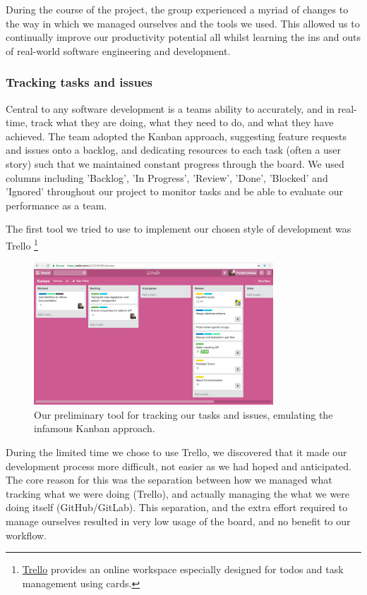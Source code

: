 During the course of the project, the group experienced a myriad of changes to the way in which we managed ourselves and the tools we used. This allowed us to continually improve our productivity potential all whilst learning the ins and outs of real-world software engineering and development.

\subsubsection{Tracking tasks and issues}

Central to any software development is a teams ability to accurately, and in real-time, track what they are doing, what they need to do, and what they have achieved. The team adopted the Kanban approach, suggesting feature requests and issues onto a backlog, and dedicating resources to each task (often a user story) such that we maintained constant progress through the board. We used columns including 'Backlog', 'In Progress', 'Review', 'Done',  'Blocked' and 'Ignored' throughout our project to monitor tasks and be able to evaluate our performance as a team.

The first tool we tried to use to implement our chosen style of development was Trello \footnote{\href{https://trello.com}{Trello} provides an online workspace especially designed for todos and task management using cards.}

\begin{figure}[H]
	\centering
	\includegraphics[width=0.8\textwidth]{images/trello-kanban}	
	\caption[CowHub's 'Kanban' board on Trello]{
		Our preliminary tool for tracking our tasks and issues, emulating the infamous Kanban approach.
	}
\end{figure}

During the limited time we chose to use Trello, we discovered that it made our development process more difficult, not easier as we had hoped and anticipated. The core reason for this was the separation between how we managed what tracking what we were doing (Trello), and actually managing the what we were doing itself (GitHub/GitLab). This separation, and the extra effort required to manage ourselves resulted in very low usage of the board, and no benefit to our workflow.

